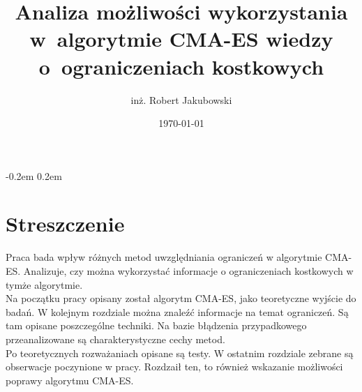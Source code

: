 \documentclass{mini}
\title{Analiza możliwości wykorzystania w~algorytmie CMA-ES wiedzy o~ograniczeniach kostkowych}
\author{inż. Robert Jakubowski}
\date{\today}
\begin{document}
\maketitle

\pagebreak
\thispagestyle{empty}

\openup -0.2em %
\tableofcontents
\openup 0.2em %

\thispagestyle{empty}
\raggedbottom
\pagebreak


\section{Streszczenie}
Praca bada wpływ różnych metod uwzględniania ograniczeń w algorytmie CMA-ES. Analizuje, czy można wykorzystać informacje o ograniczeniach kostkowych w tymże algorytmie.\\
Na początku pracy opisany został algorytm CMA-ES, jako teoretyczne wyjście do badań. W kolejnym rozdziale można znaleźć informacje na temat ograniczeń. Są tam opisane poszczególne techniki. Na bazie błądzenia przypadkowego przeanalizowane są charakterystyczne cechy metod.\\
Po teoretycznych rozważaniach opisane są testy.
W ostatnim rozdziale zebrane są obserwacje poczynione w pracy. Rozdzaił ten, to również wskazanie możliwości poprawy algorytmu CMA-ES.

\pagebreak
\end{document}
